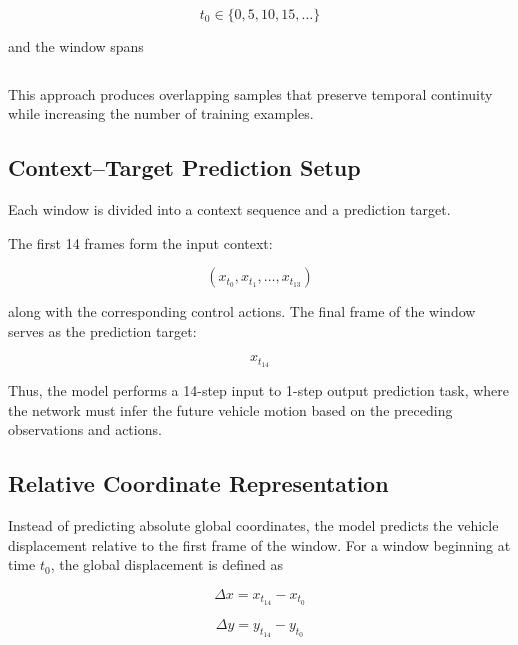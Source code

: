 \documentclass[preprint,12pt]{elsarticle}
\begin{document}
\begin{equation}
t_0 \in \{0, 5, 10, 15, \ldots\}
\end{equation}

and the window spans

\begin{equation}
[t_0, t_0 + 14]
\end{equation}

This approach produces overlapping samples that preserve temporal continuity while 
increasing the number of training examples.

\subsection{Context--Target Prediction Setup}

Each window is divided into a context sequence and a prediction target.

The first 14 frames form the input context:

\begin{equation}
(x_{t_0}, x_{t_1}, \ldots, x_{t_{13}})
\end{equation}

along with the corresponding control actions. The final frame of the window serves as the prediction target:

\begin{equation}
x_{t_{14}}
\end{equation}

Thus, the model performs a 14-step input to 1-step output prediction task, where the network must infer the future vehicle motion based on the preceding observations and actions.

\subsection{Relative Coordinate Representation}

Instead of predicting absolute global coordinates, the model predicts the vehicle displacement relative to the first frame of the window. For a window beginning at time $t_0$, the global displacement is defined as

\begin{equation}
\Delta x = x_{t_{14}} - x_{t_0}
\end{equation}

\begin{equation}
\Delta y = y_{t_{14}} - y_{t_0}
\end{equation}
\end{document}
